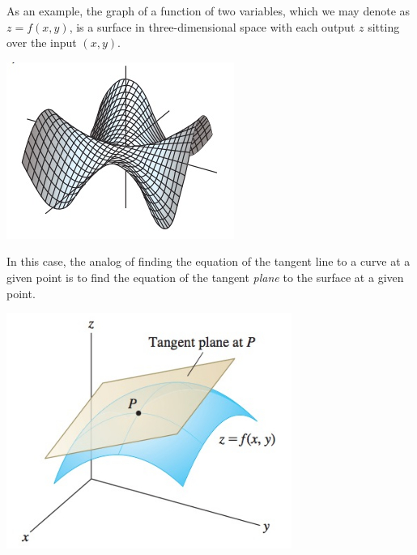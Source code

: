 \documentclass[12pt,letterpaper,reqno]{article}
\numberwithin{equation}{section}
\newcommand{\ti}[1]{\textit{#1}}
\begin{document}
As an example, the graph of a function of two variables, which we may denote as $z=f(x,y)$, is a surface in three-dimensional space with each output $z$ sitting over the input $(x,y)$.
\begin{center}
	\includegraphics[scale=0.5]{figures_mvc/graph_of_z_of_x_y}
\end{center}
In this case, the analog of finding the equation of the tangent line to a curve at a given point is to find the equation of the tangent \ti{plane} to the surface at a given point.
\begin{center}
	\includegraphics[scale=0.5]{figures_mvc/tangent_plane_example}
\end{center}
\end{document}
